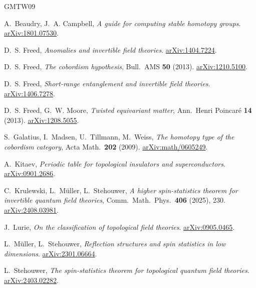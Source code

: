 \documentclass[11pt,a4paper]{article}
\begin{document}
\renewcommand{\refname}{Further references}
\begin{thebibliography}{GMTW09}

A.~Beaudry, J.~A. Campbell,
\emph{A guide for computing stable homotopy groups}.
\href{https://arxiv.org/abs/1801.07530}{arXiv:1801.07530}.

D.~S. Freed,
\emph{Anomalies and invertible field theories}.
\href{https://arxiv.org/abs/1404.7224}{arXiv:1404.7224}.

D.~S. Freed,
\emph{The cobordism hypothesis},
Bull.\ AMS \textbf{50} (2013).
\href{https://arxiv.org/abs/1210.5100}{arXiv:1210.5100}.

D.~S. Freed,
\emph{Short-range entanglement and invertible field theories}.
\href{https://arxiv.org/abs/1406.7278}{arXiv:1406.7278}.

D.~S. Freed, G.~W. Moore,
\emph{Twisted equivariant matter},
Ann.\ Henri Poincar\'e \textbf{14} (2013).
\href{https://arxiv.org/abs/1208.5055}{arXiv:1208.5055}.

S.~Galatius, I.~Madsen, U.~Tillmann, M.~Weiss,
\emph{The homotopy type of the cobordism category},
Acta Math.\ \textbf{202} (2009).
\href{https://arxiv.org/abs/math/0605249}{arXiv:math/0605249}.

A.~Kitaev,
\emph{Periodic table for topological insulators and superconductors}.
\href{https://arxiv.org/abs/0901.2686}{arXiv:0901.2686}.

C.~Krulewski, L.~M\"uller, L.~Stehouwer,
\emph{A higher spin-statistics theorem for invertible quantum field theories},
Comm.\ Math.\ Phys.\ \textbf{406} (2025), 230.
\href{https://arxiv.org/abs/2408.03981}{arXiv:2408.03981}.

J.~Lurie,
\emph{On the classification of topological field theories}.
\href{https://arxiv.org/abs/0905.0465}{arXiv:0905.0465}.

L.~M\"uller, L.~Stehouwer,
\emph{Reflection structures and spin statistics in low dimensions}.
\href{https://arxiv.org/abs/2301.06664}{arXiv:2301.06664}.

L.~Stehouwer,
\emph{The spin-statistics theorem for topological quantum field theories}.
\href{https://arxiv.org/abs/2403.02282}{arXiv:2403.02282}.

\end{thebibliography}
\end{document}
